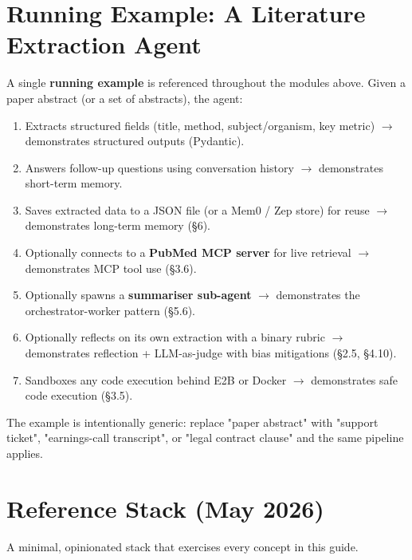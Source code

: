 \documentclass[a4paper,11pt]{article}
\begin{document}
\section{Running Example: A Literature Extraction Agent}

A single \textbf{running example} is referenced throughout the
modules above. Given a paper abstract (or a set of abstracts), the
agent:

\begin{enumerate}[noitemsep, leftmargin=1.4em]
  \item Extracts structured fields (title, method, subject/organism,
        key metric) $\to$ demonstrates structured outputs (Pydantic).
  \item Answers follow-up questions using conversation history $\to$
        demonstrates short-term memory.
  \item Saves extracted data to a JSON file (or a Mem0 / Zep store)
        for reuse $\to$ demonstrates long-term memory (§6).
  \item Optionally connects to a \textbf{PubMed MCP server} for live
        retrieval $\to$ demonstrates MCP tool use (§3.6).
  \item Optionally spawns a \textbf{summariser sub-agent} $\to$
        demonstrates the orchestrator-worker pattern (§5.6).
  \item Optionally reflects on its own extraction with a binary
        rubric $\to$ demonstrates reflection + LLM-as-judge with
        bias mitigations (§2.5, §4.10).
  \item Sandboxes any code execution behind E2B or Docker $\to$
        demonstrates safe code execution (§3.5).
\end{enumerate}

The example is intentionally generic: replace "paper abstract"
with "support ticket", "earnings-call transcript", or "legal
contract clause" and the same pipeline applies.

\section{Reference Stack (May 2026)}

A minimal, opinionated stack that exercises every concept in this
guide.
\end{document}
